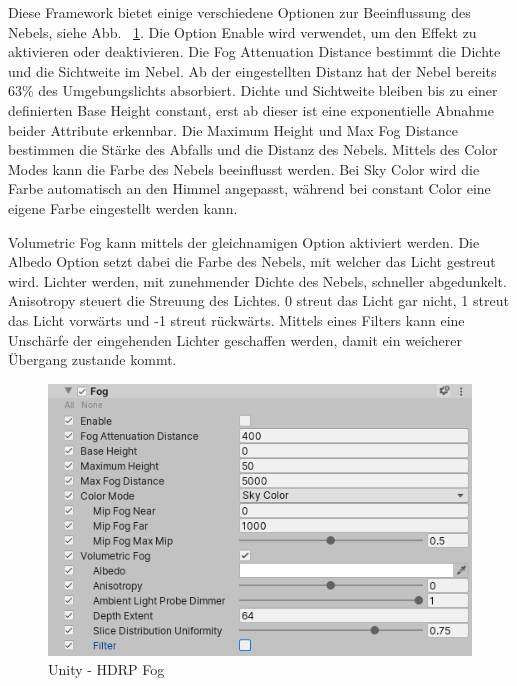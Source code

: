 Diese Framework bietet einige verschiedene Optionen zur Beeinflussung des Nebels, siehe Abb. ~\ref{fig:unity-hdrp-fog}.
Die Option Enable wird verwendet, um den Effekt zu aktivieren oder deaktivieren.
Die Fog Attenuation Distance bestimmt die Dichte und die Sichtweite im Nebel.
Ab der eingestellten Distanz hat der Nebel bereits 63\% des Umgebungslichts absorbiert.
Dichte und Sichtweite bleiben bis zu einer definierten Base Height constant, erst ab dieser ist eine exponentielle Abnahme beider Attribute erkennbar.
Die Maximum Height und Max Fog Distance bestimmen die Stärke des Abfalls und die Distanz des Nebels.
Mittels des Color Modes kann die Farbe des Nebels beeinflusst werden.
Bei Sky Color wird die Farbe automatisch an den Himmel angepasst, während bei constant Color eine eigene Farbe eingestellt werden kann.

Volumetric Fog kann mittels der gleichnamigen Option aktiviert werden.
Die Albedo Option setzt dabei die Farbe des Nebels, mit welcher das Licht gestreut wird.
Lichter werden, mit zunehmender Dichte des Nebels, schneller abgedunkelt.
Anisotropy steuert die Streuung des Lichtes.
0 streut das Licht gar nicht, 1 streut das Licht vorwärts und -1 streut rückwärts.
Mittels eines Filters kann eine Unschärfe der eingehenden Lichter geschaffen werden, damit ein weicherer Übergang zustande kommt.
~\cite{Unity_HDRP_Fog_2022}

\begin {figure}
    \centering
    \includegraphics[scale=0.9]{pics/unity-hdrp-fog}
    \caption{Unity - HDRP Fog}
    \label{fig:unity-hdrp-fog}
\end {figure}



